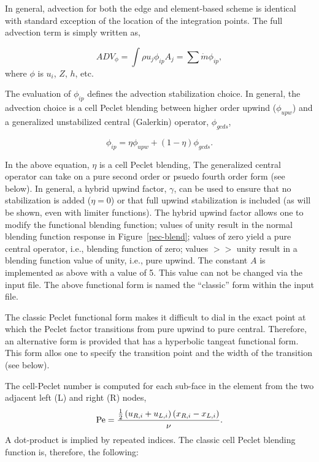 In general, advection for both the edge and element-based
scheme is identical with standard exception of the location of the integration
points. The full advection term is simply written as,

\begin{equation}
  ADV_{\phi} = \int \rho u_j \phi_{ip} A_j = \sum \dot{m} \phi_{ip},
\label{advForm}
\end{equation}
%
where $\phi$ is $u_i$, $Z$, $h$, etc.

The evaluation of $\phi_{ip}$ defines the advection stabilization choice. 
In general, the advection choice is a cell Peclet blending between higher
order upwind ($\phi_{upw}$) and a generalized unstabilized central 
(Galerkin) operator, $\phi_{gcds}$,

\begin{equation}
  \phi_{ip} = \eta \phi_{upw} + (1-\eta)\phi_{gcds}.
\end{equation}
\label{advPhiIP}
%

In the above equation, $\eta$ is a cell Peclet blending, The generalized
central operator can take on a pure second order or psuedo fourth order form (see below). 
In general, a hybrid upwind factor, $\gamma$, can be used to ensure that no stabilization 
is added ($\eta = 0$) or that full upwind stabilization is included (as will be shown, 
even with limiter functions). The hybrid upwind factor allows one to modify the functional
blending function; values of unity result in the normal blending function 
response in  Figure~\ref{pec-blend}; values of zero yield
a pure central operator, i.e., blending function of zero; values $>>$ unity result 
in a blending function value of unity, i.e., pure upwind. The constant $A$
is implemented as above with a value of 5. This value can not be changed
via the input file. The above functional form is named the ``classic'' form
within the input file.

The classic Peclet functional form makes it difficult to dial in the exact
point at which the Peclet factor transitions from pure upwind to pure central. 
Therefore, an alternative form is provided that has a hyperbolic tangeat 
functional form. This form allos one to specify the transition point and 
the width of the transition (see below).

The cell-Peclet number is computed for each sub-face in the element
from the two adjacent left (L) and right (R) nodes,
\begin{equation}
   {\rm Pe} = {{{1 \over 2} \left( u_{R,i} + u_{L,i} \right) 
                      \left( x_{R,i} - x_{L,i} \right) } \over \nu }.
\end{equation}
A dot-product is implied by repeated indices. The classic cell Peclet blending
function is, therefore, the following:


